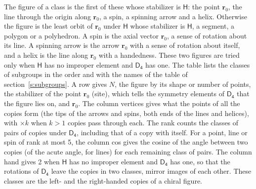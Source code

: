 \documentclass[10pt,a4paper]{article}
\numberwithin{equation}{section}
\newcommand{\grp}[1]{\mathsf{#1}}
\newcommand{\pointr}{\mathbf{r}}
\begin{document}
\leavevmode\label{n:head.figure}The figure of a class is the first of these whose stabilizer is $\grp{H}$: the point $\pointr_0$, the line through the origin along $\pointr_0$, a spin, a spinning arrow and a helix. Otherwise the figure is the least orbit of $\pointr_0$ under $\grp{H}$ whose stabilizer is $\grp{H}$, a segment, a polygon or a polyhedron. A spin is the axial vector $\pointr_0$, a sense of rotation about its line. A spinning arrow is the arrow $\pointr_0$ with a sense of rotation about itself, and a helix is the line along $\pointr_0$ with a handedness. These two figures are tried only when $\grp{H}$ has no improper element and $\grp{D_{4}}$ has one. The table lists the classes of subgroups in the order and with the names of the table of section~\ref{s:subgroups}. \label{n:head.site}A row gives $N$, the figure by its shape or number of points, the stabilizer of the point $\pointr_0$ (site), which tells the symmetry elements of $\grp{D_{4}}$ that the figure lies on, and $\pointr_0$. \label{n:head.vertices}The column vertices gives what the points of all the copies form (the tips of the arrows and spins, both ends of the lines and helices), with ${\times}k$ when $k > 1$ copies pass through each. \label{n:head.rank}The rank counts the classes of pairs of copies under $\grp{D_{4}}$, including that of a copy with itself. \label{n:head.cos}For a point, line or spin of rank at most 5, the column cos gives the cosine of the angle between two copies (of the acute angle, for lines) for each remaining class of pairs. \label{n:head.hand}The column hand gives 2 when $\grp{H}$ has no improper element and $\grp{D_{4}}$ has one, so that the rotations of $\grp{D_{4}}$ leave the copies in two classes, mirror images of each other. These classes are the left- and the right-handed copies of a chiral figure.
\end{document}
